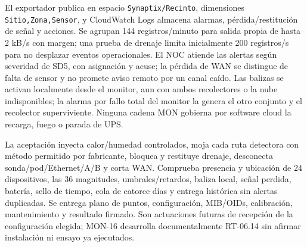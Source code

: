 El exportador publica en espacio \texttt{Synaptix/Recinto}, dimensiones \texttt{Sitio,Zona,Sensor}, y CloudWatch Logs almacena alarmas, pérdida/restitución de señal y acciones. Se agrupan 144 registros/minuto para salida propia de hasta 2 kB/s con margen; una prueba de drenaje limita inicialmente 200 registros/s para no desplazar eventos operacionales. El NOC atiende las alertas según severidad de SD5, con asignación y acuse; la pérdida de WAN se distingue de falta de sensor y no promete aviso remoto por un canal caído. Las balizas se activan localmente desde el monitor, aun con ambos recolectores o la nube indisponibles; la alarma por fallo total del monitor la genera el otro conjunto y el recolector superviviente. Ninguna cadena MON gobierna por software cloud la recarga, fuego o parada de UPS.

La aceptación inyecta calor/humedad controlados, moja cada ruta detectora con método permitido por fabricante, bloquea y restituye drenaje, desconecta sonda/pod/Ethernet/A/B y corta WAN. Comprueba presencia y ubicación de 24 dispositivos, las 36 magnitudes, umbrales/retardos, baliza local, señal perdida, batería, sello de tiempo, cola de catorce días y entrega histórica sin alertas duplicadas. Se entrega plano de puntos, configuración, MIB/OIDs, calibración, mantenimiento y resultado firmado. Son actuaciones futuras de recepción de la configuración elegida; MON-16 desarrolla documentalmente RT-06.14 sin afirmar instalación ni ensayo ya ejecutados.
